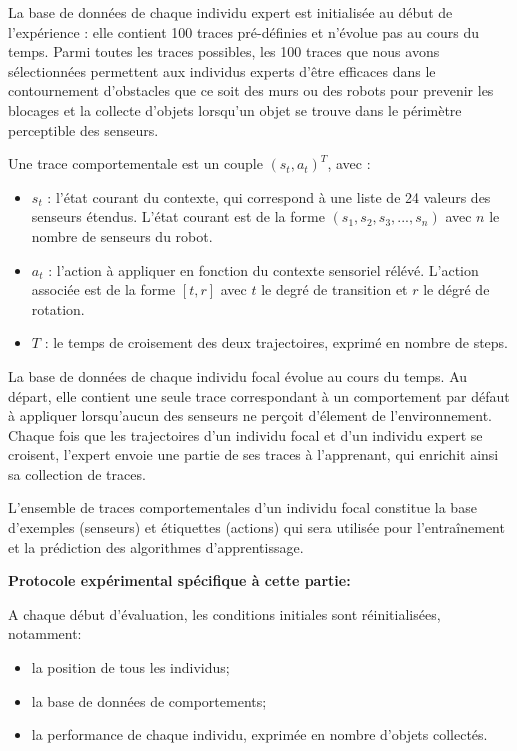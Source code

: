\documentclass[a4paper, 12pt]{report}
\begin{document}
	La base de données de chaque individu expert est initialisée au début de l'expérience : elle contient 100 traces pré-définies et n'évolue pas au cours du temps. Parmi toutes les traces possibles, les 100 traces que nous avons sélectionnées permettent aux individus experts d'être efficaces dans le contournement d'obstacles que ce soit des murs ou des robots pour prevenir les blocages et la collecte d'objets lorsqu'un objet se trouve dans le périmètre perceptible des senseurs.
	
	Une trace comportementale est un couple $( s_t, a_t )^T$, avec :
	\begin{itemize}
	\item $s_t$ : l'état courant du contexte, qui correspond à une liste de 24 valeurs des senseurs étendus. L'état courant est de la forme 
    $(s_1, s_2, s_3, ..., s_n)$ avec $n$ le nombre de senseurs du robot. 
	\item $a_t$ : l'action à appliquer en fonction du contexte sensoriel rélévé. L'action associée est de la forme $[t,r]$ avec $t$ le degré de transition et $r$ le dégré de rotation.
	\item $T$ : le temps de croisement des deux trajectoires, exprimé en nombre de steps. 
	\end{itemize}


	La base de données de chaque individu focal évolue au cours du temps. Au départ, elle contient une seule trace correspondant à un comportement par défaut à appliquer lorsqu'aucun des senseurs ne perçoit d'élement de l'environnement. Chaque fois que les trajectoires d'un individu focal et d'un individu expert se croisent, l'expert envoie une partie de ses traces à l'apprenant, qui enrichit ainsi sa collection de traces.
	
    L'ensemble de traces comportementales d'un individu focal constitue la base d'exemples (senseurs) et étiquettes (actions) qui sera utilisée pour l'entraînement et la prédiction des algorithmes d'apprentissage.
    
    \:
    
    \textbf{Protocole expérimental spécifique à cette partie:} 
    
    A chaque début d'évaluation, les conditions initiales sont réinitialisées, notamment:
    \begin{itemize}
	\item la position de tous les individus;
    \item la base de données de comportements;
    \item la performance de chaque individu, exprimée en nombre d'objets collectés.
	\end{itemize}
    
\end{document}
